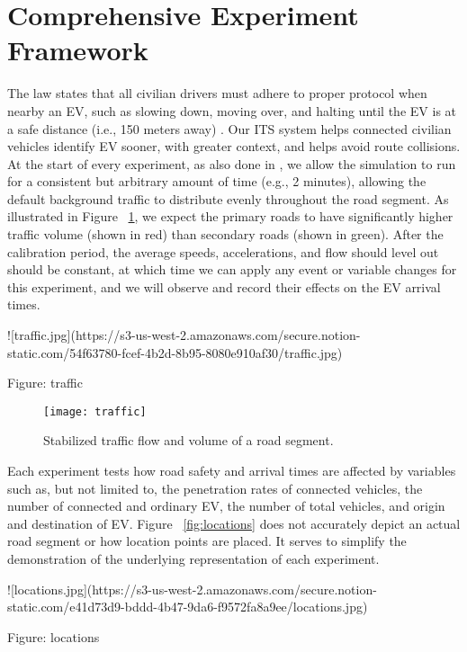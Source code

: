 \section{Comprehensive Experiment Framework}

The law states that all civilian drivers must adhere to proper protocol when nearby an \acrshort{EV}, such as slowing down, moving over, and halting until the \acrshort{EV} is at a safe distance (i.e., 150 meters away) \cite{MoveOver_2021, MTO_2020}. Our \acrshort{ITS} system helps connected civilian vehicles identify \acrshort{EV} sooner, with greater context, and helps avoid route collisions. At the start of every experiment, as also done in \cite{Rizvi2007, Bahaaldin2017}, we allow the simulation to run for a consistent but arbitrary amount of time (e.g., 2 minutes), allowing the default background traffic to distribute evenly throughout the road segment. As illustrated in Figure ~\ref{fig:traffic}, we expect the primary roads to have significantly higher traffic volume (shown in red) than secondary roads (shown in green). After the calibration period, the average speeds, accelerations, and flow should level out should be constant, at which time we can apply any event or variable changes for this experiment, and we will observe and record their effects on the \acrshort{EV} arrival times.

![traffic.jpg](https://s3-us-west-2.amazonaws.com/secure.notion-static.com/54f63780-fcef-4b2d-8b95-8080e910af30/traffic.jpg)

Figure: traffic

\begin{figure}
\texttt{[image: traffic]}
\caption{Stabilized traffic flow and volume of a road segment.}
\label{fig:traffic}
\end{figure}

Each experiment tests how road safety and arrival times are affected by variables such as, but not limited to, the penetration rates of connected vehicles, the number of connected and ordinary \acrshort{EV}, the number of total vehicles, and origin and destination of \acrshort{EV}. Figure ~\ref{fig:locations} does not accurately depict an actual road segment or how location points are placed. It serves to simplify the demonstration of the underlying representation of each experiment.

![locations.jpg](https://s3-us-west-2.amazonaws.com/secure.notion-static.com/e41d73d9-bddd-4b47-9da6-f9572fa8a9ee/locations.jpg)

Figure: locations

